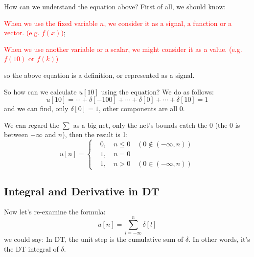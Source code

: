         How can we understand the equation above? First of all, we should know:
                        \begin{center}
                            \textcolor{red}{When we use the fixed variable $n$, we consider it as a signal, a function or a vector. (e.g. $f(x)$)};

                            \textcolor{red}{When we use another variable or a scalar, we might consider it as a value. (e.g. $f(10)$ or $f(k)$)}
                        \end{center}
        so the above equation is a definition, or represented as a signal.

        So how can we calculate $u[10]$ using the equation? We do as follows:
                        \begin{equation}
                            u[10] = \cdots + \delta[-100] + \cdots + \delta[0] + \cdots + \delta[10]=1
                        \end{equation}
        and we can find, only $\delta[0] = 1$, other components are all 0.

        We can regard the $\sum$ as a big net, only the net's bounds catch the 0
        (the 0 is between $-\infty$ and $n$), then the result is 1:
                        \begin{equation}
                            u[n] = 
                            \left\{
                                \begin{aligned}
                                    &0, \quad n \leq 0 \quad (0 \notin (-\infty, n) )\\
                                    &1, \quad n = 0\\
                                    &1, \quad n > 0\quad (0 \in (-\infty, n) )
                                \end{aligned}
                            \right.
                        \end{equation}
                        
    \subsection{Integral and Derivative in DT}
        Now let's re-examine the formula:
                        \begin{equation}
                            u[n] = \sum_{l=-\infty}^{n} \delta[l]
                        \end{equation}
        we could say: In DT, the unit step is the cumulative sum of $\delta$.
        In other words, it's the DT integral of $\delta$.

